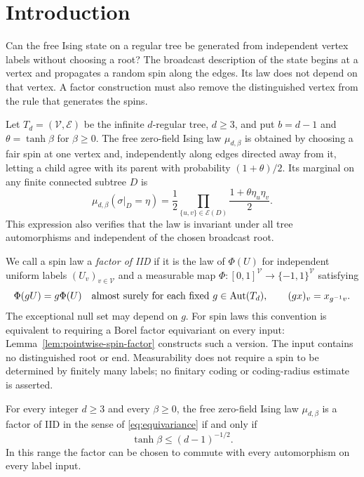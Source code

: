 \section{Introduction}\label{sec:introduction}

Can the free Ising state on a regular tree be generated from independent
vertex labels without choosing a root? The broadcast description of the
state begins at a vertex and propagates a random spin along the edges.
Its law does not depend on that vertex. A factor construction must also
remove the distinguished vertex from the rule that generates the spins.

Let $T_d=(\mathcal V,\mathcal E)$ be the infinite $d$-regular tree,
$d\ge3$, and put $b=d-1$ and $\theta=\tanh\beta$ for $\beta\ge0$.
The free zero-field Ising law $\mu_{d,\beta}$ is obtained by choosing a
fair spin at one vertex and, independently along edges directed away
from it, letting a child agree with its parent with probability
$(1+\theta)/2$. Its marginal on any finite connected subtree $D$ is
\[
 \mu_{d,\beta}(\sigma|_D=\eta)
   =\frac12\prod_{\{u,v\}\in\mathcal E(D)}
                      \frac{1+\theta\eta_u\eta_v}{2}.
\]
This expression also verifies that the law is invariant under all tree
automorphisms and independent of the chosen broadcast root.

We call a spin law a \emph{factor of IID} if it is the law of
$\Phi(U)$ for independent uniform labels $(U_v)_{v\in\mathcal V}$ and
a measurable map $\Phi:[0,1]^{\mathcal V}\to\{-1,1\}^{\mathcal V}$
satisfying
\begin{equation}\label{eq:equivariance}
 \Phi(gU)=g\Phi(U)\quad\text{almost surely for each fixed }
                 g\in\operatorname{Aut}(T_d),\qquad (gx)_v=x_{g^{-1}v}.
\end{equation}
The exceptional null set may depend on $g$. For spin laws this convention
is equivalent to requiring a Borel factor equivariant on every input:
Lemma~\ref{lem:pointwise-spin-factor} constructs such a version.
The input contains no distinguished root or end. Measurability does not require a spin to be
determined by finitely many labels; no finitary coding or coding-radius
estimate is asserted.

\begin{theorem}\label{thm:main}\label{thm:sharp}
For every integer $d\ge3$ and every $\beta\ge0$, the free zero-field
Ising law $\mu_{d,\beta}$ is a factor of IID in the sense of
\eqref{eq:equivariance} if and only if
\[
                         \tanh\beta\le(d-1)^{-1/2}.
\]
In this range the factor can be chosen to commute with every
automorphism on every label input.
\end{theorem}

